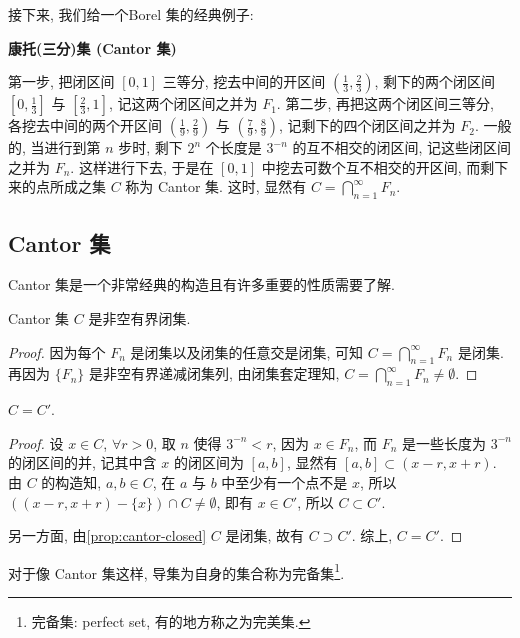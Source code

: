 接下来, 我们给一个Borel 集的经典例子:

\begin{example} \label{ex:contor-def}
    \textbf{康托(三分)集 (Cantor 集)}

    第一步, 把闭区间 $[0, 1]$ 三等分, 挖去中间的开区间 $(\frac{1}{3}, \frac{2}{3})$, 剩下的两个闭区间 $[0, \frac{1}{3}]$ 与 $[\frac{2}{3}, 1]$, 记这两个闭区间之并为 $F_1$. 
    第二步, 再把这两个闭区间三等分, 各挖去中间的两个开区间 $(\frac{1}{9}, \frac{2}{9})$ 与 $(\frac{7}{9}, \frac{8}{9})$, 记剩下的四个闭区间之并为 $F_2$.
    一般的, 当进行到第 $n$ 步时, 剩下 $2^n$ 个长度是 $3^{-n}$ 的互不相交的闭区间, 记这些闭区间之并为 $F_n$. 这样进行下去, 于是在 $[0, 1]$ 中挖去可数个互不相交的开区间, 而剩下来的点所成之集 $C$ 称为 Cantor 集.
    这时, 显然有 $C = \bigcap\limits_{n=1}^{\infty} F_n$.
\end{example}

\subsection{Cantor 集}
Cantor 集是一个非常经典的构造且有许多重要的性质需要了解.

\begin{proposition} \label{prop:cantor-closed}
    Cantor 集 $C$ 是非空有界闭集.
\end{proposition}
\begin{proof}
    因为每个 $F_n$ 是闭集以及闭集的任意交是闭集, 可知 $C = \bigcap\limits_{n=1}^\infty F_n$ 是闭集. 再因为 $\{F_n\}$ 是非空有界递减闭集列, 由闭集套定理知, $C = \bigcap\limits_{n=1}^\infty F_n \ne \emptyset$.
\end{proof}

\begin{proposition} \label{prop:cantor-perfect}
    $C = C'$.\quad 
\end{proposition}
\begin{proof}
设 $x \in C$, $\forall r>0$, 取 $n$ 使得 $3^{-n}<r$, 因为 $x\in F_n$, 而 $F_n$ 是一些长度为 $3^{-n}$ 的闭区间的并, 记其中含 $x$
的闭区间为 $[a, b]$, 显然有 $[a, b]\subset(x-r, x+r)$. 由 $C$ 的构造知, $a, b \in C$, 在 $a$ 与 $b$ 中至少有一个点不是 $x$,
所以 $((x-r, x+r)-\{x\})\cap C \ne \emptyset$, 即有 $x\in C'$, 所以 $C \subset C'$.

另一方面, 由\cref{prop:cantor-closed} $C$ 是闭集,  故有 $C \supset C'$. 综上, $C = C'$.
\end{proof}

对于像 Cantor 集这样, 导集为自身的集合称为完备集\footnote{完备集: perfect set, 有的地方称之为完美集.}.

